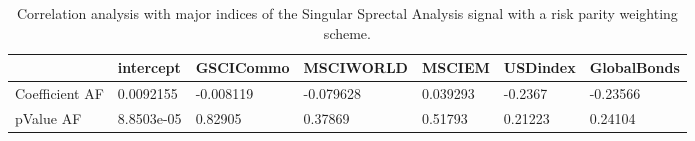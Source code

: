 \begin{table}[H]
\centering
\begin{tabular}{lllllll}
& intercept & GSCICommo & MSCIWORLD & MSCIEM & USDindex & GlobalBonds \\ 
\hline 
Coefficient AF & 0.0092155 & -0.008119 & -0.079628 & 0.039293 & -0.2367 & -0.23566 \\ 
pValue AF & 8.8503e-05 & 0.82905 & 0.37869 & 0.51793 & 0.21223 & 0.24104 \\ 
\hline
\end{tabular}
\caption{Correlation analysis with major indices of the Singular Sprectal Analysis signal with a risk parity weighting scheme.}
\label{SSA_RP_AFACTOR}
\end{table}